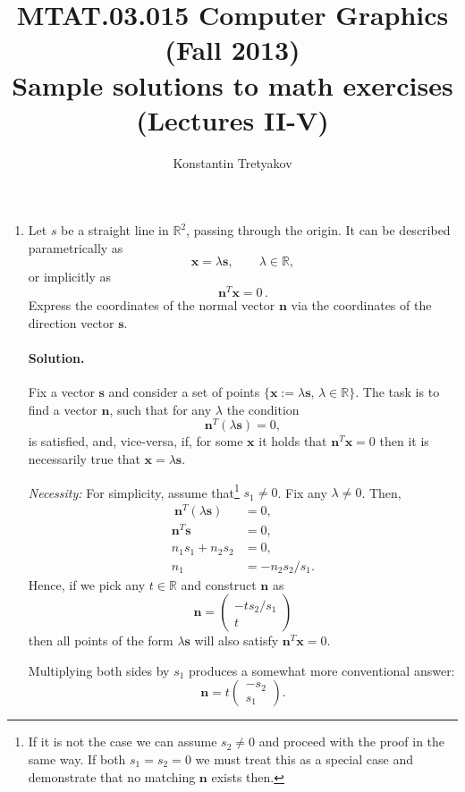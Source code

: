 \documentclass{article}
\newcommand{\bbR}{\mathbb{R}}
\newcommand{\bx}{\mathbf{x}}
\newcommand{\bs}{\mathbf{s}}
\newcommand{\bn}{\mathbf{n}}
\begin{document}
\title{MTAT.03.015 Computer Graphics (Fall 2013)\\
\medskip
\Large Sample solutions to math exercises (Lectures II-V)}
\author{Konstantin Tretyakov}
\date{}
\maketitle


\begin{enumerate}
\item Let $s$ be a straight line in $\bbR^2$, passing through the origin. It can be described parametrically as
$$
\bx = \lambda \bs, \qquad \lambda \in \bbR,
$$
or implicitly as
$$
\bn^T\bx = 0\,.
$$
Express the coordinates of the normal vector $\bn$ via the coordinates of the direction vector $\bs$.

\paragraph{Solution.} Fix a vector $\bs$ and consider a set of points $\{\bx:=\lambda \bs, \, \lambda \in \bbR\}$. The task is to find a vector $\bn$, such that for any $\lambda$ the condition
$$
\bn^T(\lambda \bs) = 0,
$$
is satisfied, and, vice-versa, if, for some $\bx$ it holds that $\bn^T\bx=0$ then it is necessarily true that $\bx = \lambda \bs$.

\emph{Necessity:} For simplicity, assume that\footnote{If it is not the case we can assume $s_2 \neq 0$ and proceed with the proof in the same way. If both $s_1 = s_2 = 0$ we must treat this as a special case and demonstrate that no matching $\bn$ exists then.}  $s_1 \neq 0$. Fix any $\lambda\neq 0$. Then,
\begin{align*}\
\bn^T(\lambda \bs) &= 0,\\
\bn^T\bs &=0,\\
n_1 s_1 + n_2s_2 &= 0,\\
n_1 &= -n_2s_2/s_1.
\end{align*}
Hence, if we pick any $t \in \bbR$ and construct $\bn$ as
$$
\bn = \left(\begin{array}{c} -ts_2/s_1 \\ t \end{array}\right)
$$
then all points of the form $\lambda \bs$ will also satisfy $\bn^T\bx = 0$.

Multiplying both sides by $s_1$ produces a somewhat more conventional answer:
$$
\bn = t\left(\begin{array}{c} -s_2 \\ s_1 \end{array}\right).
$$


\end{enumerate}
\end{document}
